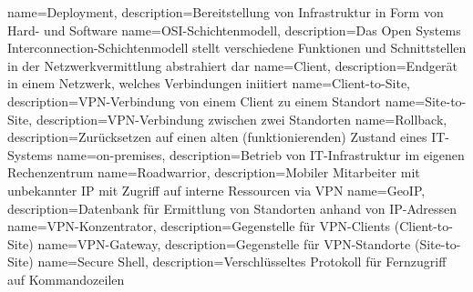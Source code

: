 {
        name=Deployment,
        description={Bereitstellung von Infrastruktur in Form von Hard- und Software}
}
{
        name=OSI-Schichtenmodell,
        description={Das Open Systems Interconnection-Schichtenmodell stellt verschiedene Funktionen und Schnittstellen in der Netzwerkvermittlung abstrahiert dar}
}
{
        name=Client,
        description={Endgerät in einem Netzwerk, welches Verbindungen iniitiert}
}
{
        name=Client-to-Site,
        description={VPN-Verbindung von einem Client zu einem Standort}
}
{
        name=Site-to-Site,
        description={VPN-Verbindung zwischen zwei Standorten}
}
{
        name=Rollback,
        description={Zurücksetzen auf einen alten (funktionierenden) Zustand eines IT-Systems}
}
{
        name=on-premises,
        description={Betrieb von IT-Infrastruktur im eigenen Rechenzentrum}
}
{
        name=Roadwarrior,
        description={Mobiler Mitarbeiter mit unbekannter IP mit Zugriff auf interne Ressourcen via VPN}
}
{
        name=GeoIP,
        description={Datenbank für Ermittlung von Standorten anhand von IP-Adressen}
}
{
        name=VPN-Konzentrator,
        description=Gegenstelle für VPN-Clients (Client-to-Site)
}
{
        name=VPN-Gateway,
        description=Gegenstelle für VPN-Standorte (Site-to-Site)
}
{
        name=Secure Shell,
        description=Verschlüsseltes Protokoll für Fernzugriff auf Kommandozeilen
} 
